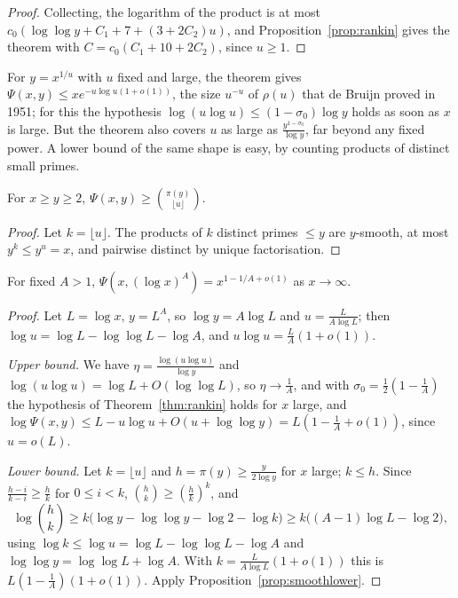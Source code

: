 \begin{proof}
Collecting, the logarithm of the product is at most $c_0(\log\log y+C_1+7+(3+2C_2)u)$, and Proposition~\ref{prop:rankin} gives the theorem with $C=c_0(C_1+10+2C_2)$, since $u\ge1$.
\end{proof}

For $y=x^{1/u}$ with $u$ fixed and large, the theorem gives $\Psi(x,y)\le xe^{-u\log u(1+o(1))}$, the size $u^{-u}$ of $\rho(u)$ that de Bruijn proved in 1951; for this the hypothesis $\log(u\log u)\le(1-\sigma_0)\log y$ holds as soon as $x$ is large. But the theorem also covers $u$ as large as $\frac{y^{1-\sigma_0}}{\log y}$, far beyond any fixed power. A lower bound of the same shape is easy, by counting products of distinct small primes.

\begin{proposition}\label{prop:smoothlower}
For $x\ge y\ge2$, $\Psi(x,y)\ge\binom{\pi(y)}{\lfloor u\rfloor}$.
\end{proposition}
\begin{proof}
Let $k=\lfloor u\rfloor$. The products of $k$ distinct primes $\le y$ are $y$-smooth, at most $y^k\le y^u=x$, and pairwise distinct by unique factorisation.
\end{proof}

\begin{corollary}\label{cor:psilogpower}
For fixed $A>1$, $\Psi(x,(\log x)^A)=x^{1-1/A+o(1)}$ as $x\to\infty$.
\end{corollary}
\begin{proof}
Let $L=\log x$, $y=L^A$, so $\log y=A\log L$ and $u=\frac L{A\log L}$; then $\log u=\log L-\log\log L-\log A$, and $u\log u=\frac LA(1+o(1))$.

\emph{Upper bound.} We have $\eta=\frac{\log(u\log u)}{\log y}$ and $\log(u\log u)=\log L+O(\log\log L)$, so $\eta\to\frac1A$, and with $\sigma_0=\frac12(1-\frac1A)$ the hypothesis of Theorem~\ref{thm:rankin} holds for $x$ large, and $\log\Psi(x,y)\le L-u\log u+O(u+\log\log y)=L(1-\frac1A+o(1))$, since $u=o(L)$.

\emph{Lower bound.} Let $k=\lfloor u\rfloor$ and $h=\pi(y)\ge\frac y{2\log y}$ for $x$ large; $k\le h$. Since $\frac{h-i}{k-i}\ge\frac hk$ for $0\le i<k$, $\binom hk\ge(\frac hk)^k$, and
\[
\log\binom hk\ge k\bigl(\log y-\log\log y-\log2-\log k\bigr)\ge k\bigl((A-1)\log L-\log2\bigr),
\]
using $\log k\le\log u=\log L-\log\log L-\log A$ and $\log\log y=\log\log L+\log A$. With $k=\frac L{A\log L}(1+o(1))$ this is $L(1-\frac1A)(1+o(1))$. Apply Proposition~\ref{prop:smoothlower}.
\end{proof}

